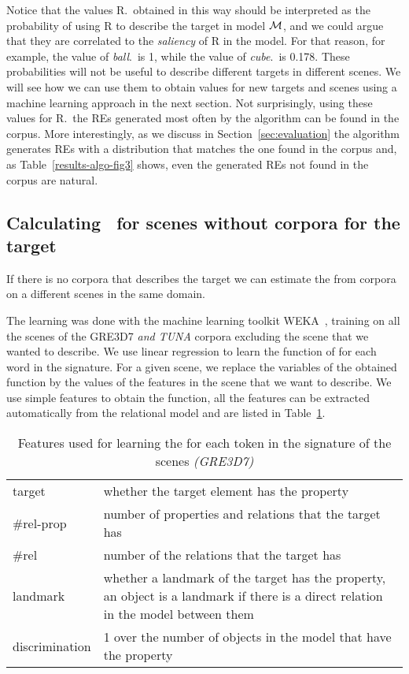 Notice that the values R.\puse\ obtained in this way should be interpreted as the probability of using R to describe the target in model 
$\mathcal{M}$, and we could argue that they are correlated to the \emph{saliency} of R in the model.  
For that reason, for example, the value of \emph{ball}.\puse\ is 1, while the value of \emph{cube}.\puse\ is 0.178.  
These probabilities will not be useful to describe different targets in different scenes.  We will see how we can use them to obtain
 values for new targets and scenes using a machine learning approach in the next section.  Not surprisingly, using these values for 
R.\puse\ the REs generated most often by the algorithm can be found in the corpus.  More interestingly, as we discuss in 
Section~\ref{sec:evaluation} the algorithm generates REs with a distribution that matches the one found in the corpus and, 
as Table~\ref{results-algo-fig3} shows, even the generated REs not found in the corpus are natural.    


\subsection{Calculating \puse\ for scenes without corpora for the target} \label{subsec:learning}

If there is no corpora that describes the target we can estimate the \puse from corpora on a different scenes in the same domain. 


The learning was done with the machine learning toolkit WEKA~\cite{Hall:WEK09}, training on all the scenes of the GRE3D7 \textit{and TUNA} 
corpora excluding 
the scene that we wanted  to describe. We use linear regression to learn the function of \puse for each word in the signature. 
For a given scene, we replace the variables of the obtained function by the values of the features in the scene that we want to describe. 
We use simple features to obtain the function, all the features can be extracted automatically from the relational model and are listed 
in Table~\ref{features}.  

\begin{small}
\begin{table}[h!]
\begin{center}
\begin{tabular}{|l|p{10cm}|}
\hline
target & whether the target element has the property \\
\#rel-prop & number of properties and relations that the target has\\
\#rel & number of the relations that the target has \\
landmark & whether a landmark of the target has the property, an object is a landmark if there is a direct relation in the model 
between them \\
discrimination & 1 over the number of objects in the model that have the property \\
\hline
\end{tabular}
\caption{Features used for learning the \puse for each token in the signature of the scenes \textit{(GRE3D7)} \label{features}}
\end{center}
\end{table}
\end{small}

